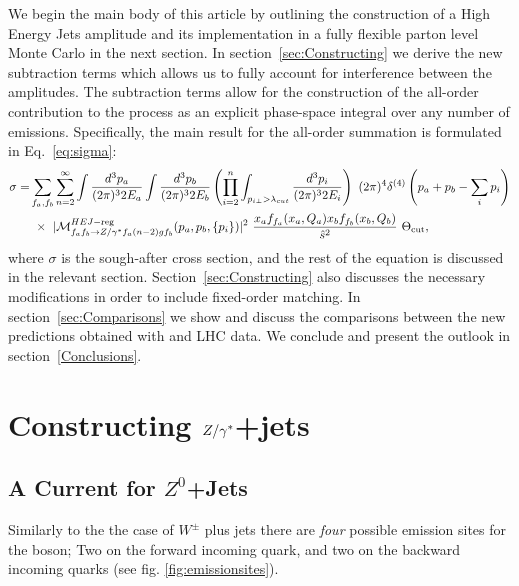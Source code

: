 		We begin the main body of this article by outlining the construction of a
		High Energy Jets amplitude and its implementation in a fully flexible parton
		level Monte Carlo in the next section.  In section~\ref{sec:Constructing} we
		derive the new subtraction terms which allows us to fully account for
		interference between the amplitudes. The subtraction terms allow for the
		construction of the all-order contribution to the process as an explicit
		phase-space integral over any number of emissions. Specifically, the
		main result for the all-order summation is formulated in
		Eq.~\eqref{eq:sigma}:
		\begin{align}
		  \nonumber
		  \begin{split}
		    \sigma =& \sum_{f_a,f_b} \sum_{n=2}^\infty \int \frac{d^3 p_a}{(2\pi)^3 2E_a} \int \frac{d^3
		      p_b}{(2\pi)^3 2E_b}  \left( \prod_{i=2}^n \int_{p_{i\perp}>\lambda_{cut}} \frac{d^3 p_i}{(2\pi)^3
		        2E_i} \right)\ (2\pi)^4 \delta^{(4)}\left(p_a+p_b - \sum_i p_i\right) \\
		    & \ \times \ |\mathcal{M}^{HEJ-{\rm reg}}_{f_af_b\to Z/\gamma^*
		      f_a(n-2)gf_b}(p_a,p_b,\{p_i\})|^2 \ \frac{ x_a f_{f_a}(x_a, Q_a) x_b
		      f_{f_b}(x_b,Q_b)}{\hat s^2}\ \Theta_{\rm cut},
		  \end{split}
		\end{align}
		where $\sigma$ is the sough-after cross
		section, and the rest of the equation is discussed in the relevant section. Section~\ref{sec:Constructing} also discusses the necessary
		modifications in order to include fixed-order matching. In
		section~\ref{sec:Comparisons} we show and discuss the comparisons between the new
		predictions obtained with \hej and LHC data. We conclude and present the
		outlook in section~\ref{Conclusions}.

\section{Constructing $Z/\gamma^*$+jets}
	\label{sec:Zcurrents}

	\subsection{A Current for $Z^0$+Jets}

		Similarly to the the case of $W^\pm$ plus jets there are \emph{four} possible
		emission sites for the boson; Two on the forward incoming quark, and two on the
		backward incoming quarks (see fig. \ref{fig:emissionsites}).

